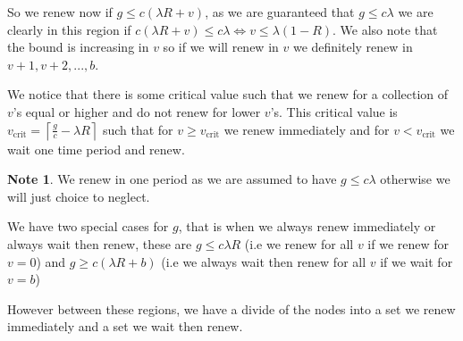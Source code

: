 \documentclass[a4paper,10pt]{article}
\newcommand{\ceil}[1]{\left \lceil #1 \right \rceil}
\theoremstyle{definition}
\theoremstyle{definition}
\theoremstyle{remark}
\theoremstyle{definition}
\newtheorem*{note}{Note}
\begin{document}
So we renew now if $g \leq c (\lambda R +v)$, as we are guaranteed that $g \leq c \lambda$ we are clearly in this region if $ c (\lambda R +v) \leq c \lambda \iff v \leq \lambda (1-R)$. We also note that the bound is increasing in $v$ so if we will renew in $v$ we definitely renew in $v+1,v+2,...,b$.

We notice that there is some critical value such that we renew for a collection of $v$'s equal or higher and do not renew for lower $v$'s. This critical value is $v_{\text{crit}}=\ceil{\frac{g}{c} - \lambda R}$ such that for $v \geq v_{\text{crit}}$ we renew immediately and for $v < v_{\text{crit}}$ we wait one time period and renew.

\begin{note}
We renew in one period as we are assumed to have $g \leq c \lambda$ otherwise we will just choice to neglect.
\end{note}

We have two special cases for $g$, that is when we always renew immediately or always wait then renew, these are $g \leq  c \lambda R$ (i.e we renew for all $v$ if we renew for $v=0$) and $g \geq c (\lambda R +b)$ (i.e we always wait then renew for all $v$ if we wait for $v=b$)

However between these regions, we have a divide of the nodes into a set we renew immediately and a set we wait then renew.
\end{document}

